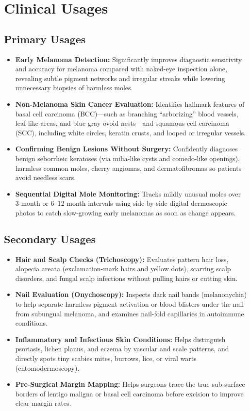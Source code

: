\section{Clinical Usages}

\subsection{Primary Usages}
\begin{itemize}
\item \textbf{Early Melanoma Detection:} Significantly improves diagnostic sensitivity and accuracy for melanoma compared with naked-eye inspection alone, revealing subtle pigment networks and irregular streaks while lowering unnecessary biopsies of harmless moles.
\item \textbf{Non-Melanoma Skin Cancer Evaluation:} Identifies hallmark features of basal cell carcinoma (BCC)---such as branching ``arborizing'' blood vessels, leaf-like areas, and blue-gray ovoid nests---and squamous cell carcinoma (SCC), including white circles, keratin crusts, and looped or irregular vessels.
\item \textbf{Confirming Benign Lesions Without Surgery:} Confidently diagnoses benign seborrheic keratoses (via milia-like cysts and comedo-like openings), harmless common moles, cherry angiomas, and dermatofibromas so patients avoid needless scars.
\item \textbf{Sequential Digital Mole Monitoring:} Tracks mildly unusual moles over 3-month or 6--12 month intervals using side-by-side digital dermoscopic photos to catch slow-growing early melanomas as soon as change appears.
\end{itemize}

\subsection{Secondary Usages}
\begin{itemize}
\item \textbf{Hair and Scalp Checks (Trichoscopy):} Evaluates pattern hair loss, alopecia areata (exclamation-mark hairs and yellow dots), scarring scalp disorders, and fungal scalp infections without pulling hairs or cutting skin.
\item \textbf{Nail Evaluation (Onychoscopy):} Inspects dark nail bands (melanonychia) to help separate harmless pigment activation or blood blisters under the nail from subungual melanoma, and examines nail-fold capillaries in autoimmune conditions.
\item \textbf{Inflammatory and Infectious Skin Conditions:} Helps distinguish psoriasis, lichen planus, and eczema by vascular and scale patterns, and directly spots tiny scabies mites, burrows, lice, or viral warts (entomodermoscopy).
\item \textbf{Pre-Surgical Margin Mapping:} Helps surgeons trace the true sub-surface borders of lentigo maligna or basal cell carcinoma before excision to improve clear-margin rates.
\end{itemize}

